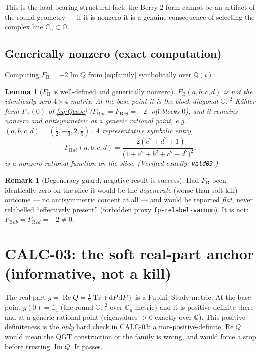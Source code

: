 \documentclass[11pt]{article}
\newcommand{\Tr}{\operatorname{Tr}}
\renewcommand{\Re}{\operatorname{Re}}
\renewcommand{\Im}{\operatorname{Im}}
\newcommand{\dd}{\mathrm{d}}
\newcommand{\Cu}{\mathbb{C}_u}
\newcommand{\FB}{F_{\mathrm{B}}}
\theoremstyle{plain}
\newtheorem{lemma}{Lemma}
\theoremstyle{definition}
\newtheorem{remark}{Remark}
\begin{document}
This is the load-bearing structural fact: the Berry $2$-form cannot be an artifact of
the round geometry --- if it is nonzero it is a genuine consequence of selecting the
complex line $\Cu\subset\mathbb{O}$.

\subsection{Generically nonzero (exact computation)}

Computing $\FB=-2\Im Q$ from \eqref{eq:family} symbolically over $\mathbb{Q}(i)$:

\begin{lemma}[$\FB$ is well-defined and generically nonzero]
\label{lem:nonzero}
$\FB(a,b,c,d)$ is not the identically-zero $4\times4$ matrix. At the base point it is
the block-diagonal $\mathbb{CP}^2$ K\"ahler form $\FB(0)$ of \eqref{eq:Qbase}
($\FB{}_{ab}=\FB{}_{cd}=-2$, off-blocks $0$), and it remains nonzero and antisymmetric
at a generic rational point, e.g.\ $(a,b,c,d)=(\tfrac12,-\tfrac13,2,\tfrac15)$. A
representative symbolic entry,
\begin{equation}
  \FB{}_{ab}(a,b,c,d)=\frac{-2(c^2+d^2+1)}{\big(1+a^2+b^2+c^2+d^2\big)^2},
  \label{eq:FBsym}
\end{equation}
is a nonzero rational function on the slice. (Verified exactly; \texttt{vald03}.)
\end{lemma}

\begin{remark}[Degeneracy guard; negative-result-is-success]
\label{rem:degen}
Had $\FB$ been identically zero on the slice it would be the \emph{degenerate}
(worse-than-soft-kill) outcome --- no antisymmetric content at all --- and would be
reported \emph{flat}, never relabelled ``effectively present'' (forbidden proxy
\texttt{fp-relabel-vacuum}). It is not: $\FB{}_{ab}=\FB{}_{cd}=-2\neq0$.
\end{remark}

\section{CALC-03: the soft real-part anchor (informative, not a kill)}
\label{sec:calc03}

The real part $g=\Re Q=\tfrac12\Tr(\dd P\,\dd P)$ is a Fubini--Study metric. At the
base point $g(0)=\mathbb{1}_4$ (the round $\mathbb{CP}^2$-over-$\Cu$ metric) and it is
positive-definite there and at a generic rational point (eigenvalues $>0$ exactly over
$\mathbb{Q}$). This positive-definiteness is the \emph{only} hard check in CALC-03: a
non-positive-definite $\Re Q$ would mean the QGT construction or the family is wrong,
and would force a stop before trusting $\Im Q$. It passes.
\end{document}
